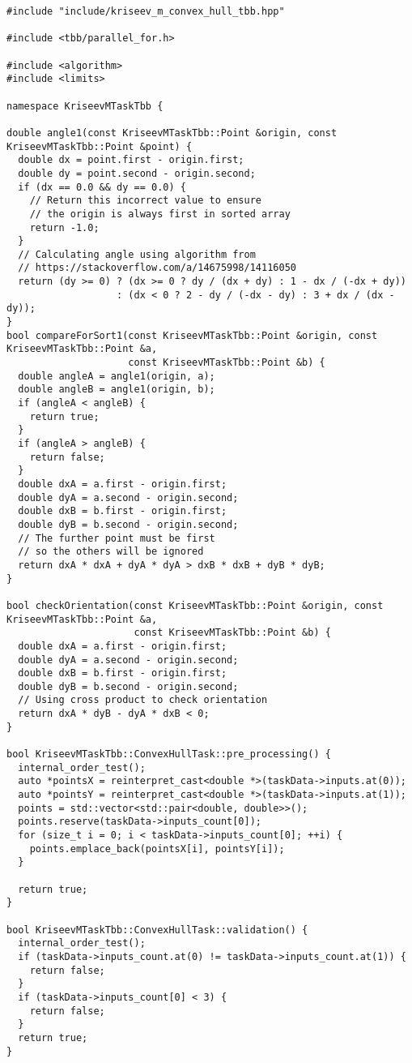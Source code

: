 \documentclass[a4paper]{article}
\begin{document}
\begin{lstlisting}
#include "include/kriseev_m_convex_hull_tbb.hpp"

#include <tbb/parallel_for.h>

#include <algorithm>
#include <limits>

namespace KriseevMTaskTbb {

double angle1(const KriseevMTaskTbb::Point &origin, const KriseevMTaskTbb::Point &point) {
  double dx = point.first - origin.first;
  double dy = point.second - origin.second;
  if (dx == 0.0 && dy == 0.0) {
    // Return this incorrect value to ensure 
    // the origin is always first in sorted array
    return -1.0;
  }
  // Calculating angle using algorithm from 
  // https://stackoverflow.com/a/14675998/14116050
  return (dy >= 0) ? (dx >= 0 ? dy / (dx + dy) : 1 - dx / (-dx + dy))
                   : (dx < 0 ? 2 - dy / (-dx - dy) : 3 + dx / (dx - dy));
}
bool compareForSort1(const KriseevMTaskTbb::Point &origin, const KriseevMTaskTbb::Point &a,
                     const KriseevMTaskTbb::Point &b) {
  double angleA = angle1(origin, a);
  double angleB = angle1(origin, b);
  if (angleA < angleB) {
    return true;
  }
  if (angleA > angleB) {
    return false;
  }
  double dxA = a.first - origin.first;
  double dyA = a.second - origin.second;
  double dxB = b.first - origin.first;
  double dyB = b.second - origin.second;
  // The further point must be first
  // so the others will be ignored
  return dxA * dxA + dyA * dyA > dxB * dxB + dyB * dyB;
}

bool checkOrientation(const KriseevMTaskTbb::Point &origin, const KriseevMTaskTbb::Point &a,
                      const KriseevMTaskTbb::Point &b) {
  double dxA = a.first - origin.first;
  double dyA = a.second - origin.second;
  double dxB = b.first - origin.first;
  double dyB = b.second - origin.second;
  // Using cross product to check orientation
  return dxA * dyB - dyA * dxB < 0;
}

bool KriseevMTaskTbb::ConvexHullTask::pre_processing() {
  internal_order_test();
  auto *pointsX = reinterpret_cast<double *>(taskData->inputs.at(0));
  auto *pointsY = reinterpret_cast<double *>(taskData->inputs.at(1));
  points = std::vector<std::pair<double, double>>();
  points.reserve(taskData->inputs_count[0]);
  for (size_t i = 0; i < taskData->inputs_count[0]; ++i) {
    points.emplace_back(pointsX[i], pointsY[i]);
  }

  return true;
}

bool KriseevMTaskTbb::ConvexHullTask::validation() {
  internal_order_test();
  if (taskData->inputs_count.at(0) != taskData->inputs_count.at(1)) {
    return false;
  }
  if (taskData->inputs_count[0] < 3) {
    return false;
  }
  return true;
}


\end{lstlisting}
\end{document}
